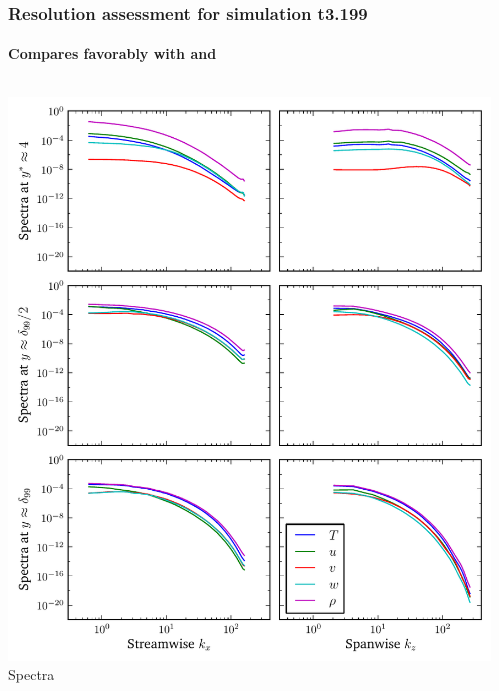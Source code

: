 \documentclass[mathserif]{beamer}
\begin{document}
\begin{frame}
    \frametitle{Resolution assessment for simulation t3.199}
    \framesubtitle{Compares favorably with \citet{Coleman1995Numerical} and \citet{Guarini2000Direct}}
    \begin{columns}
        \begin{column}{0.5\linewidth}
          \centering
          \includegraphics[width=\textwidth]{spectra-turb4134}
          \\\vspace{-0.5em}
          Spectra
        \end{column}
        \begin{column}{0.5\linewidth}
          \centering

\end{column}
\end{columns}
\end{frame}
\end{document}
